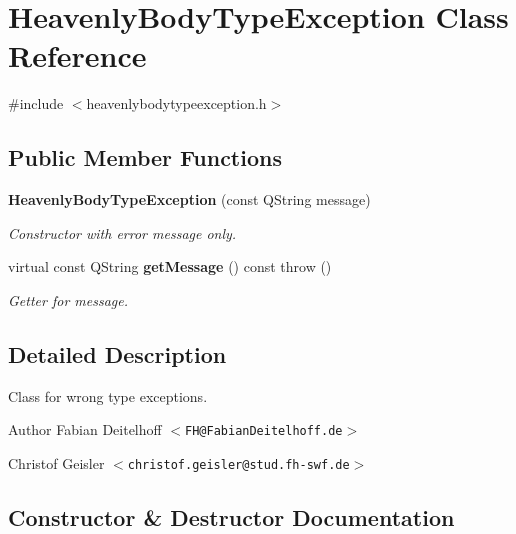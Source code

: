 \section{\-Heavenly\-Body\-Type\-Exception \-Class \-Reference}
\label{dc/d03/classHeavenlyBodyTypeException}


{\ttfamily \#include $<$heavenlybodytypeexception.\-h$>$}

\subsection*{\-Public \-Member \-Functions}
\begin{DoxyCompactItemize}
\item 
{\bf \-Heavenly\-Body\-Type\-Exception} (const \-Q\-String message)
\begin{DoxyCompactList}\small\item\em \-Constructor with error message only. \end{DoxyCompactList}\item 
virtual const \-Q\-String {\bf get\-Message} () const   throw ()
\begin{DoxyCompactList}\small\item\em \-Getter for message. \end{DoxyCompactList}\end{DoxyCompactItemize}


\subsection{\-Detailed \-Description}
\-Class for wrong type exceptions.

\begin{DoxyAuthor}{\-Author}
\-Fabian \-Deitelhoff $<${\tt \-F\-H@\-Fabian\-Deitelhoff.\-de}$>$ 

\-Christof \-Geisler $<${\tt christof.\-geisler@stud.\-fh-\/swf.\-de}$>$ 
\end{DoxyAuthor}


\subsection{\-Constructor \& \-Destructor \-Documentation}
